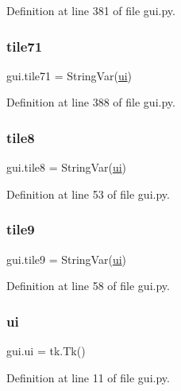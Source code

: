Definition at line 381 of file gui.\+py.

\mbox{\label{namespacegui_a177274f43bd23db55e5f2e0a5ecaa6b3}} 
\subsubsection{\texorpdfstring{tile71}{tile71}}
{\footnotesize\ttfamily gui.\+tile71 = String\+Var(\mbox{\hyperlink{namespacegui_a40ab7281456eadbea2dc2038f5c24fa1}{ui}})}



Definition at line 388 of file gui.\+py.

\mbox{\label{namespacegui_a65c29dc3a8945c02e5d60af809bdc770}} 
\subsubsection{\texorpdfstring{tile8}{tile8}}
{\footnotesize\ttfamily gui.\+tile8 = String\+Var(\mbox{\hyperlink{namespacegui_a40ab7281456eadbea2dc2038f5c24fa1}{ui}})}



Definition at line 53 of file gui.\+py.

\mbox{\label{namespacegui_a004a4a87f02c662204894326ad5e410f}} 
\subsubsection{\texorpdfstring{tile9}{tile9}}
{\footnotesize\ttfamily gui.\+tile9 = String\+Var(\mbox{\hyperlink{namespacegui_a40ab7281456eadbea2dc2038f5c24fa1}{ui}})}



Definition at line 58 of file gui.\+py.

\mbox{\label{namespacegui_a40ab7281456eadbea2dc2038f5c24fa1}} 
\subsubsection{\texorpdfstring{ui}{ui}}
{\footnotesize\ttfamily gui.\+ui = tk.\+Tk()}



Definition at line 11 of file gui.\+py.

